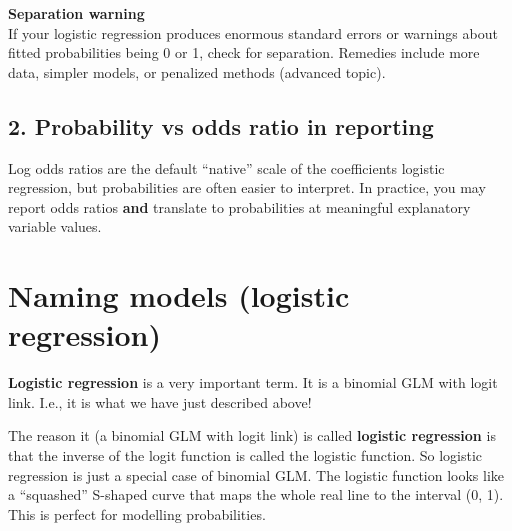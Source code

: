 \documentclass[
  letterpaper,
  8pt,
  a4paper]{book}
\begin{document}
\begin{tcolorbox}[enhanced jigsaw, arc=.35mm, bottomrule=.15mm, bottomtitle=1mm, breakable, colback=white, colbacktitle=quarto-callout-caution-color!10!white, colframe=quarto-callout-caution-color-frame, coltitle=black, left=2mm, leftrule=.75mm, opacityback=0, opacitybacktitle=0.6, rightrule=.15mm, title=\textcolor{quarto-callout-caution-color}{\faFire}\hspace{0.5em}{Caution}, titlerule=0mm, toprule=.15mm, toptitle=1mm]

\textbf{Separation warning}\\
If your logistic regression produces enormous standard errors or
warnings about fitted probabilities being 0 or 1, check for separation.
Remedies include more data, simpler models, or penalized methods
(advanced topic).

\end{tcolorbox}

\subsection*{2. Probability vs odds ratio in
reporting}\label{probability-vs-odds-ratio-in-reporting}

Log odds ratios are the default ``native'' scale of the coefficients
logistic regression, but probabilities are often easier to interpret. In
practice, you may report odds ratios \textbf{and} translate to
probabilities at meaningful explanatory variable values.

\section*{Naming models (logistic
regression)}\label{naming-models-logistic-regression}


\textbf{Logistic regression} is a very important term. It is a binomial
GLM with logit link. I.e., it is what we have just described above!

The reason it (a binomial GLM with logit link) is called
\textbf{logistic regression} is that the inverse of the logit function
is called the logistic function. So logistic regression is just a
special case of binomial GLM. The logistic function looks like a
``squashed'' S-shaped curve that maps the whole real line to the
interval (0, 1). This is perfect for modelling probabilities.
\end{document}
